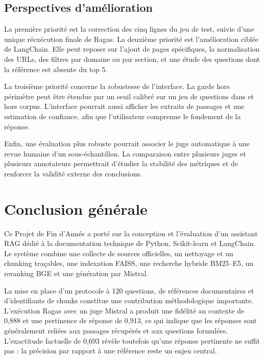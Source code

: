 \documentclass[12pt,a4paper,oneside]{report}
\begin{document}
\section{Perspectives d'amélioration}

La première priorité est la correction des cinq lignes du jeu de test, suivie
d'une unique réexécution finale de Ragas. La deuxième priorité est
l'amélioration ciblée de LangChain. Elle peut reposer sur l'ajout de pages
spécifiques, la normalisation des URLs, des filtres par domaine ou par section,
et une étude des questions dont la référence est absente du top 5.

La troisième priorité concerne la robustesse de l'interface. La garde hors
périmètre peut être étendue par un seuil calibré sur un jeu de questions dans et
hors corpus. L'interface pourrait aussi afficher les extraits de passages et
une estimation de confiance, afin que l'utilisateur comprenne le fondement de
la réponse.

Enfin, une évaluation plus robuste pourrait associer le juge automatique à une
revue humaine d'un sous-échantillon. La comparaison entre plusieurs juges et
plusieurs annotateurs permettrait d'étudier la stabilité des métriques et de
renforcer la validité externe des conclusions.

\chapter*{Conclusion générale}

Ce Projet de Fin d'Année a porté sur la conception et l'évaluation d'un assistant
RAG dédié à la documentation technique de Python, Scikit-learn et LangChain. Le
système combine une collecte de sources officielles, un nettoyage et un
chunking traçables, une indexation FAISS, une recherche hybride BM25--E5, un
reranking BGE et une génération par Mistral.

La mise en place d'un protocole à 120 questions, de références documentaires et
d'identifiants de chunks constitue une contribution méthodologique importante.
L'exécution Ragas avec un juge Mistral a produit une fidélité au contexte de
0,888 et une pertinence de réponse de 0,913, ce qui indique que les réponses
sont généralement reliées aux passages récupérés et aux questions formulées.
L'exactitude factuelle de 0,693 révèle toutefois qu'une réponse pertinente ne
suffit pas : la précision par rapport à une référence reste un enjeu central.
\end{document}
